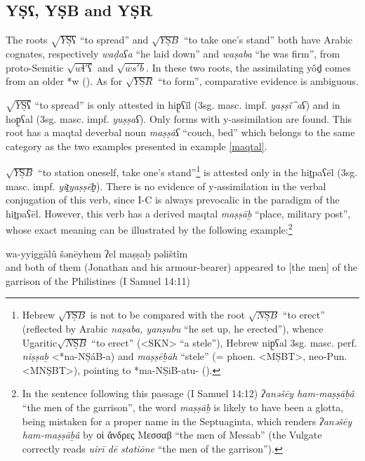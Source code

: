 \documentclass[oldfontcommands,oneside,a4paper,11pt]{article}
\newcommand{\racine}[1]{\begin{math}\sqrt{#1}\end{math}}
\newcommand{\forme}[1]{\textit{#1}}
\newcommand{\grec}[1]{{\mleccha #1}}
\begin{document}
\begin{sloppypar}
 

\subsection{YṢʕ, YṢB and YṢR } \label{ysb}
The roots \racine{YṢʕ} ``to spread'' and \racine{YṢB} ``to take one's stand'' both have Arabic cognates, respectively \forme{waḍaʕa} ``he laid down'' and \forme{waṣaba} ``he was firm'', from proto-Semitic \racine{wɬ'ʕ} and \racine{ws'b}. In these two roots, the assimilating yôd̠ comes from an older *w (\citealt[460]{huehnergard06}). As for \racine{YṢR} ``to form'', comparative evidence is ambiguous.
 
   \racine{YṢʕ} ``to spread'' is only attested in hip̠ʕîl (3sg. masc. impf. \forme{yaṣṣî^aʕ}) and in hop̠ʕal (3sg. masc. impf. \forme{yuṣṣaʕ}). Only forms with y-assimilation are found. This root has a maqtal deverbal noun \forme{maṣṣāʕ} ``couch, bed” which belongs to the same category as the two examples presented in example \ref{maqtal}.

 \racine{YṢB} ``to station oneself, take one's stand''\footnote{Hebrew \racine{YṢB} is not to be compared with the root \racine{NṢB} ``to erect'' (reflected by Arabic \forme{naṣaba, yanṣubu} ``he set up, he erected''), whence Ugaritic\racine{NṢB} ``to erect'' (<SKN> ``a stele''), Hebrew nip̠ʕal 3sg. masc. perf. \forme{niṣṣaḇ} <*na-NṢáB-a) and \forme{maṣṣēḇāh} ``stele'' (= phoen. <MṢBT>, neo-Pun. <MNṢBT>), pointing to *ma-NṢiB-atu- (\citealt[128]{krahmalov01phoenician}).} is attested only in the hit̠paʕēl (3sg. masc. impf. \forme{yit̠yaṣṣēb̠}). There is no evidence of y-assimilation in the verbal conjugation of this verb, since I-C is always prevocalic in the paradigm of the hit̠paʕēl. However, this verb has a derived maqtal \forme{maṣṣāḇ} ``place, military post'', whose exact meaning can be illustrated by the following example:\footnote{In the sentence following this passage (I Samuel 14:12) \forme{ʔanǝšēy ham-maṣṣāḇâ} ``the men of the garrison'', the word \forme{maṣṣāḇ} is likely to have been a glotta, being mistaken for a proper name in the Septuaginta, which renders \forme{ʔanǝšēy ham-maṣṣāḇâ} by \grec{οἱ ἄνδρες Μεσσαβ} ``the men of Messab'' (the Vulgate correctly reads \textit{uirī dē statiōne} ``the men of the garrison''). }
\begin{exe}
\ex \label{place}
	 wa-yyiggālû šǝnēyhem ʔel maṣṣaḇ pəlištîm \\
and both of them (Jonathan and his armour-bearer) appeared to [the men] of the garrison of the Philistines (I Samuel 14:11)
\end{exe}


\end{sloppypar}
\end{document}
